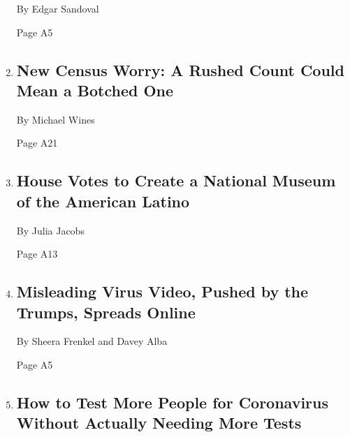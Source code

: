 \begin{enumerate}
  By Edgar Sandoval

  Page A5
\item
  \href{/2020/07/28/us/trump-census.html}{}

  \hypertarget{new-census-worry-a-rushed-count-could-mean-a-botched-one}{%
  \subsection{New Census Worry: A Rushed Count Could Mean a Botched
  One}\label{new-census-worry-a-rushed-count-could-mean-a-botched-one}}

  By Michael Wines

  Page A21
\item
  \href{/2020/07/28/arts/design/national-museum-of-the-american-latino.html}{}

  \hypertarget{house-votes-to-create-a-national-museum-of-the-american-latino}{%
  \subsection{House Votes to Create a National Museum of the American
  Latino}\label{house-votes-to-create-a-national-museum-of-the-american-latino}}

  By Julia Jacobs

  Page A13
\item
  \href{/2020/07/28/technology/virus-video-trump.html}{}

  \hypertarget{misleading-virus-video-pushed-by-the-trumps-spreads-online}{%
  \subsection{Misleading Virus Video, Pushed by the Trumps, Spreads
  Online}\label{misleading-virus-video-pushed-by-the-trumps-spreads-online}}

  By Sheera Frenkel and Davey Alba

  Page A5
\item
  \href{/interactive/2020/07/27/upshot/coronavirus-pooled-testing.html}{}

  \hypertarget{how-to-test-more-people-for-coronavirus-without-actually-needing-more-tests}{%
  \subsection{How to Test More People for Coronavirus Without Actually
  Needing More
  Tests}\label{how-to-test-more-people-for-coronavirus-without-actually-needing-more-tests}}


\end{enumerate}
